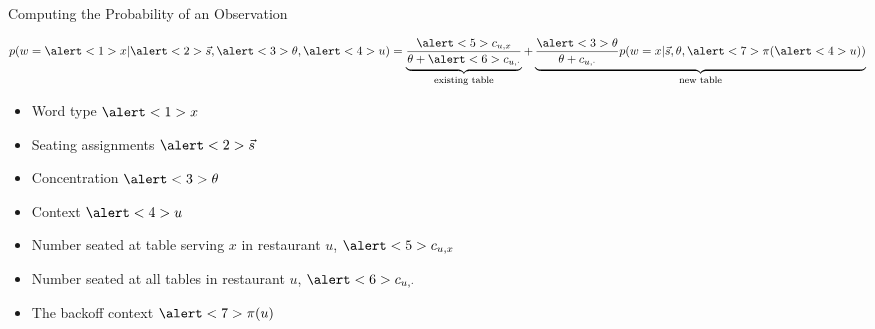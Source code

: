\documentclass[compress]{beamer}
\begin{document}
\begin{frame}{Computing the Probability of an Observation}

\begin{equation}
   p(w=\alert<1>{x} | \alert<2>{\vec{s}}, \alert<3>{\theta},
   \alert<4>{u}) = \explain{existing table}{\frac{\alert<5>{c_{u,x}}}{\theta + \alert<6>{c_{u,\cdot}}}}
   + \explain{new table}{\frac{\alert<3>{\theta}}{\theta + c_{u, \cdot}} p(w=x | \vec{s}, \theta, \alert<7>{\pi(\alert<4>{u})})}
\end{equation}

\begin{itemize}
  \item Word type $\alert<1>{x}$
  \item Seating assignments $\alert<2>{\vec{s}}$
  \item Concentration $\alert<3>{\theta}$
  \item Context $\alert<4>{u}$
  \item Number seated at table serving $x$ in restaurant $u$, $\alert<5>{c_{u,x}}$
  \item Number seated at all tables in restaurant $u$, $\alert<6>{c_{u,\cdot}}$
  \item The backoff context $\alert<7>{\pi(u)}$

\end{itemize}

\end{frame}
\end{document}
